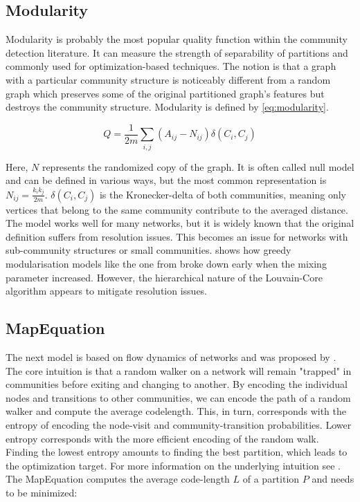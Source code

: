 \documentclass[11pt, twocolumn]{article}
\begin{document}
\subsection{Modularity}
Modularity is probably the most popular quality function within the community detection literature.\cite{fortunato_CommunityDetectionGraphs_2010} It can measure the strength of separability of partitions and commonly used for optimization-based techniques. The notion is that a graph with a particular community structure is noticeably different from a random graph which preserves some of the original partitioned graph's features but destroys the community structure. Modularity is defined by \autoref{eq:modularity}.

\begin{equation}
    \label{eq:modularity}
    Q = \frac{1}{2m}\sum_{i,j}(A_{ij}-N_{ij})\delta(C_i,C_j)
\end{equation}

Here, $N$ represents the randomized copy of the graph. It is often called null model and can be defined in various ways, but the most common representation is $N_{ij} = \frac{k_ik_j}{2m}$. $\delta(C_i, C_j)$ is the Kronecker-delta of both communities, meaning only vertices that belong to the same community contribute to the averaged distance. The model works well for many networks, but it is widely known that the original definition suffers from resolution issues. This becomes an issue for networks with sub-community structures or small communities. \citeauthor{lancichinetti_CommunityDetectionAlgorithms_2009} shows how greedy modularisation models like the one from \citeauthor{clauset_FindingCommunityStructure_2004} broke down early when the mixing parameter increased.\cite{lancichinetti_CommunityDetectionAlgorithms_2009} However, the hierarchical nature of the Louvain-Core algorithm appears to mitigate resolution issues. 
\subsection{MapEquation}
The next model is based on flow dynamics of networks and was proposed by \citeauthor{rosvall_MapEquation_2009}.\cite{rosvall_MapEquation_2009} The core intuition is that a random walker on a network will remain "trapped" in communities before exiting and changing to another. By encoding the individual nodes and transitions to other communities, we can encode the path of a random walker and compute the average codelength. This, in turn, corresponds with the entropy of encoding the node-visit and community-transition probabilities. Lower entropy corresponds with the more efficient encoding of the random walk. Finding the lowest entropy amounts to finding the best partition, which leads to the optimization target. For more information on the underlying intuition see \citeauthor{bohlin_CommunityDetectionVisualization_2014}. The MapEquation computes the average code-length $L$ of a partition $P$ and needs to be minimized:
\end{document}
